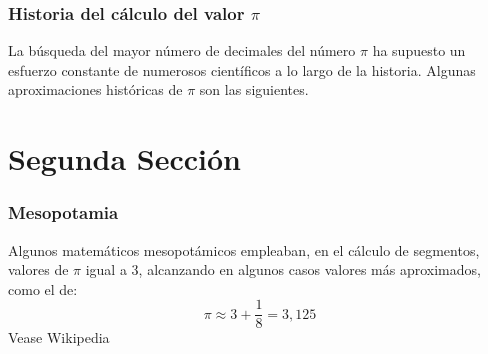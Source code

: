 \documentclass{beamer}
\begin{document}
\begin{frame}

\frametitle{Historia del cálculo del valor $\pi$}

La búsqueda del mayor número de decimales del número $\pi$ ha supuesto un esfuerzo constante de numerosos científicos a lo largo de la historia. Algunas aproximaciones históricas de $\pi$ son las siguientes.



\end{frame}

\section{Segunda Sección}

\begin{frame}
\frametitle{Mesopotamia}

Algunos matemáticos mesopotámicos empleaban, en el cálculo de segmentos, valores de $\pi$ igual a 3, alcanzando en algunos casos valores más aproximados, como el de:
  \begin{displaymath}  
  \pi \approx 3 + \frac{1}{8} = 3,125
  \end{displaymath}
  Vease \alert{Wikipedia}~\cite{latex}  
   
\end{frame}




\end{document}
